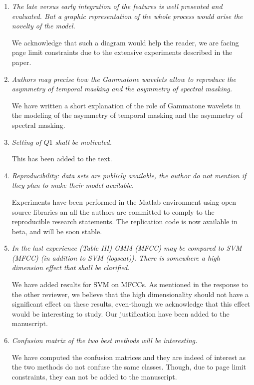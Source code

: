 \documentclass[10pt]{article}
\begin{document}
\begin{enumerate}

\item \emph{The late versus early integration of the features is well presented and evaluated. But a graphic representation of the whole process would arise the novelty of the model.}

We acknowledge that such a diagram would help the reader, we are facing page limit constraints due to the extensive experiments described in the paper.

\item \emph{Authors may precise how the Gammatone wavelets allow to reproduce the asymmetry of temporal masking and the asymmetry of spectral masking.}

We have written a short explanation of the role of Gammatone wavelets in the modeling of the asymmetry of temporal masking and the asymmetry of spectral masking.

\item \emph{Setting of $Q1$ shall be motivated.}

This has been added to the text.

\item \emph{Reproducibility:  data sets are publicly available, the author do not mention if they plan to make their model available.}

Experiments have been performed in the Matlab environment using open source libraries an all the authors are committed to comply to the reproducible research statements. The replication code is now available in beta, and will be soon stable.

\item \emph{In the last experience (Table III) GMM (MFCC) may be compared to SVM (MFCC) (in addition to SVM (logscat)). There is somewhere a high dimension effect that shall be clarified.}

We have added results for SVM on MFCCs. As mentioned in the response to the other reviewer, we believe that the high dimensionality should not have a significant effect on these results, even-though we acknowledge that this effect would be interesting to study. Our justification have been added to the manuscript.

\item \emph{Confusion matrix of the two best methods will be interesting.}

We have computed the confusion matrices and they are indeed of interest as the two methods do not confuse the same classes. Though, due to page limit constraints, they can not be added to the manuscript.


\end{enumerate}
\end{document}
